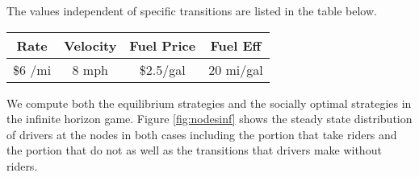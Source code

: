 The values independent of specific transitions are listed in the table below.
\begin{center}
\begin{tabular}{|cccc|}
\hline
Rate  & Velocity & Fuel Price & Fuel Eff   \\
\hline
\$6 /mi & 8 mph & \$2.5/gal & 20 mi/gal \\
\hline
\end{tabular}
\end{center}

We compute both the equilibrium strategies and the socially optimal strategies in the infinite horizon game.  Figure \ref{fig:nodesinf} shows the steady state distribution of drivers at the nodes in both cases including the portion that take riders and the portion that do not as well as the transitions that drivers make without riders. 

